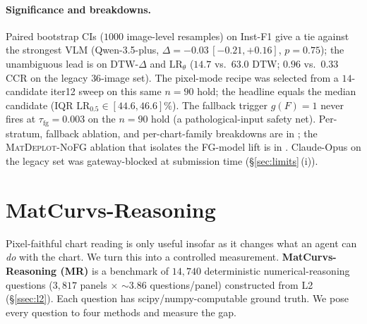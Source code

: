 \documentclass{article}
\begin{document}
\paragraph{Significance and breakdowns.}
Paired bootstrap CIs ($1000$ image-level resamples) on Inst-F1
give a tie against the strongest VLM (Qwen-3.5-plus,
$\Delta{=}{-}0.03\,[{-}0.21,{+}0.16]$, $p{=}0.75$); the unambiguous
lead is on DTW-$\Delta$ and $\mathrm{LR}_{\theta}$
($14.7$ vs.\ $63.0$ DTW; $0.96$ vs.\ $0.33$ CCR on the legacy
$36$-image set). The pixel-mode recipe was selected from a
$14$-candidate iter12 sweep on this same $n{=}90$ hold; the
headline equals the median candidate (IQR
$\mathrm{LR}_{0.5}{\in}[44.6, 46.6]\%$). The fallback trigger
$g(F){=}1$ never fires at $\tau_{\mathrm{fg}}{=}0.003$ on the
$n{=}90$ hold (a pathological-input safety net). Per-stratum,
fallback ablation, and per-chart-family breakdowns are in
; the
\textsc{MatDeplot-NoFG} ablation that isolates the FG-model lift
is in . Claude-Opus on the legacy
set was gateway-blocked at submission time
(\S\ref{sec:limits}\,(i)).


\section{MatCurvs-Reasoning}
\label{sec:reasoning}
\label{sec:downstream}  %

Pixel-faithful chart reading is only useful insofar as it changes
what an agent can \emph{do} with the chart. We turn this into a
controlled measurement. \textbf{MatCurvs-Reasoning (MR)} is a
benchmark of $14{,}740$ deterministic numerical-reasoning questions
($3,817$ panels $\times$ $\sim 3.86$ questions/panel) constructed
from L2 (\S\ref{ssec:l2}). Each question has scipy/numpy-computable
ground truth. We pose every question to four methods and measure the
gap.
\end{document}

